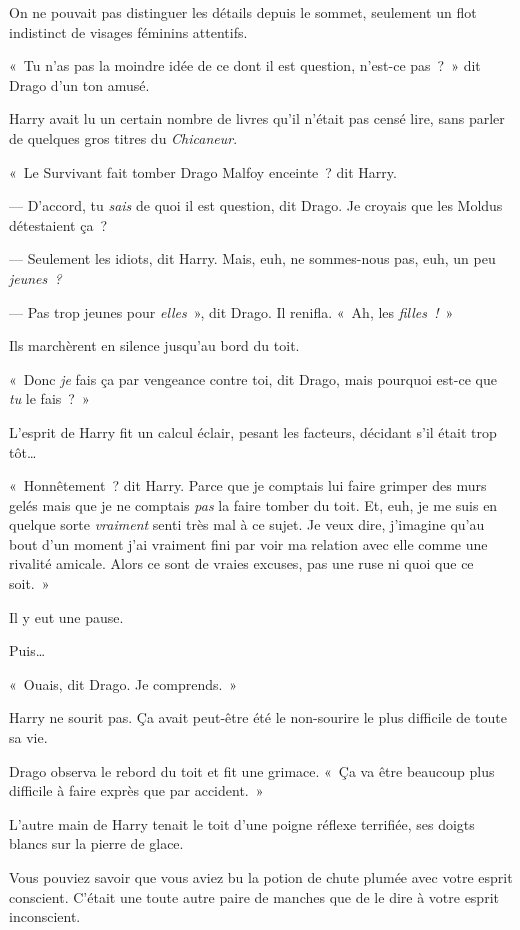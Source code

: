 \later

On ne pouvait pas distinguer les détails depuis le sommet, seulement un flot indistinct de visages féminins attentifs.

«~Tu n'as pas la moindre idée de ce dont il est question, n'est-ce pas~?~»
dit Drago d'un ton amusé.

Harry avait lu un certain nombre de livres qu'il n'était pas censé lire, sans parler de quelques gros titres du \emph{Chicaneur}.

«~Le Survivant fait tomber Drago Malfoy enceinte~? dit Harry.

--- D'accord, tu \emph{sais} de quoi il est question, dit Drago.
Je croyais que les Moldus détestaient ça~?

--- Seulement les idiots, dit Harry.
Mais, euh, ne sommes-nous pas, euh, un peu \emph{jeunes~?}

--- Pas trop jeunes pour \emph{elles}~», dit Drago.
Il renifla.
«~Ah, les \emph{filles~!}~»

Ils marchèrent en silence jusqu'au bord du toit.

«~Donc \emph{je} fais ça par vengeance contre toi, dit Drago, mais pourquoi est-ce que \emph{tu} le fais~?~»

L'esprit de Harry fit un calcul éclair, pesant les facteurs, décidant s'il était trop tôt…

«~Honnêtement~? dit Harry.
Parce que je comptais lui faire grimper des murs gelés mais que je ne comptais \emph{pas} la faire tomber du toit.
Et, euh, je me suis en quelque sorte \emph{vraiment} senti très mal à ce sujet.
Je veux dire, j'imagine qu'au bout d'un moment j'ai vraiment fini par voir ma relation avec elle comme une rivalité amicale.
Alors ce sont de vraies excuses, pas une ruse ni quoi que ce soit.~»

Il y eut une pause.

Puis…

«~Ouais, dit Drago.
Je comprends.~»

Harry ne sourit pas.
Ça avait peut-être été le non-sourire le plus difficile de toute sa vie.

Drago observa le rebord du toit et fit une grimace.
«~Ça va être beaucoup plus difficile à faire exprès que par accident.~»

\later

L'autre main de Harry tenait le toit d'une poigne réflexe terrifiée, ses doigts blancs sur la pierre de glace.

Vous pouviez savoir que vous aviez bu la potion de chute plumée avec votre esprit conscient.
C'était une toute autre paire de manches que de le dire à votre esprit inconscient.

